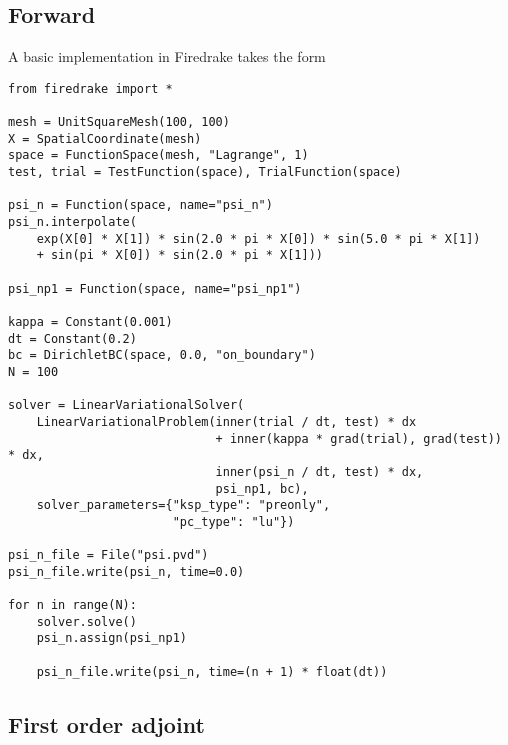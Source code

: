 \documentclass[11pt]{article}
\begin{document}
\subsection{Forward}

A basic implementation in Firedrake takes the form
\begin{lstlisting}
from firedrake import *

mesh = UnitSquareMesh(100, 100)
X = SpatialCoordinate(mesh)
space = FunctionSpace(mesh, "Lagrange", 1)
test, trial = TestFunction(space), TrialFunction(space)

psi_n = Function(space, name="psi_n")
psi_n.interpolate(
    exp(X[0] * X[1]) * sin(2.0 * pi * X[0]) * sin(5.0 * pi * X[1])
    + sin(pi * X[0]) * sin(2.0 * pi * X[1]))

psi_np1 = Function(space, name="psi_np1")

kappa = Constant(0.001)
dt = Constant(0.2)
bc = DirichletBC(space, 0.0, "on_boundary")
N = 100

solver = LinearVariationalSolver(
    LinearVariationalProblem(inner(trial / dt, test) * dx
                             + inner(kappa * grad(trial), grad(test)) * dx,
                             inner(psi_n / dt, test) * dx,
                             psi_np1, bc),
    solver_parameters={"ksp_type": "preonly",
                       "pc_type": "lu"})

psi_n_file = File("psi.pvd")
psi_n_file.write(psi_n, time=0.0)

for n in range(N):
    solver.solve()
    psi_n.assign(psi_np1)

    psi_n_file.write(psi_n, time=(n + 1) * float(dt))
\end{lstlisting}

\subsection{First order adjoint}
\end{document}
